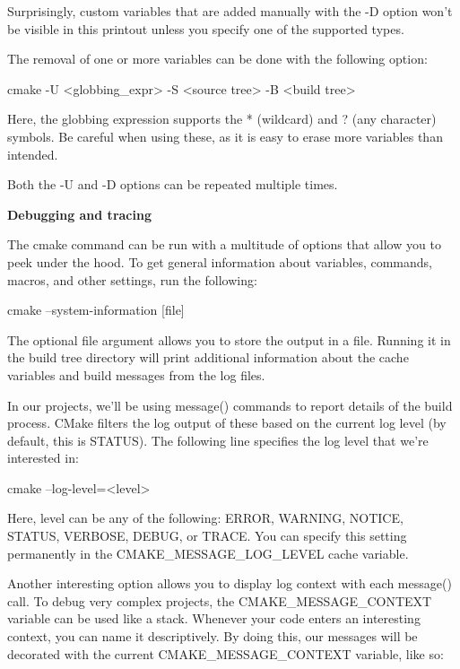 Surprisingly, custom variables that are added manually with the -D option won’t be visible in this printout unless you specify one of the supported types.

The removal of one or more variables can be done with the following option:

\begin{shell}
cmake -U <globbing_expr> -S <source tree> -B <build tree>
\end{shell}

Here, the globbing expression supports the * (wildcard) and ? (any character) symbols. Be careful when using these, as it is easy to erase more variables than intended.

Both the -U and -D options can be repeated multiple times.

\noindent
\textbf{Debugging and tracing}

The cmake command can be run with a multitude of options that allow you to peek under the hood. To get general information about variables, commands, macros, and other settings, run the following:

\begin{shell}
cmake --system-information [file]
\end{shell}

The optional file argument allows you to store the output in a file. Running it in the build tree directory will print additional information about the cache variables and build messages from the log files.

In our projects, we’ll be using message() commands to report details of the build process. CMake filters the log output of these based on the current log level (by default, this is STATUS). The following line specifies the log level that we’re interested in:

\begin{shell}
cmake --log-level=<level>
\end{shell}

Here, level can be any of the following: ERROR, WARNING, NOTICE, STATUS, VERBOSE, DEBUG, or TRACE. You can specify this setting permanently in the CMAKE\_MESSAGE\_LOG\_LEVEL cache variable.

Another interesting option allows you to display log context with each message() call. To debug very complex projects, the CMAKE\_MESSAGE\_CONTEXT variable can be used like a stack. Whenever your code enters an interesting context, you can name it descriptively. By doing this, our messages will be decorated with the current CMAKE\_MESSAGE\_CONTEXT variable, like so:

